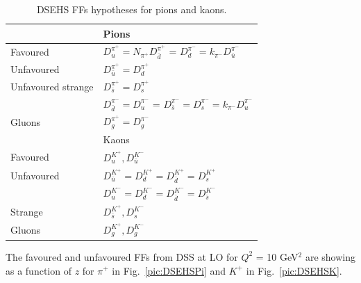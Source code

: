 \begin{table}[!h]
  \caption{DSEHS FFs hypotheses for pions and kaons.}
  \label{tab:DSEHSParametrization}
  \centering
  \begin{tabular}{ll}
    \hline
    \hline
     & Pions \\
    \hline
    Favoured & $D^{\pi^{+}}_{u} = N_{\pi^{+}} D^{\pi^{+}}_{\bar{d}}$ = $D^{\pi^{-}}_{d} = k_{\pi^{-}} D^{\pi^{-}}_{\bar{u}}$ \\
    Unfavoured & $D^{\pi^{+}}_{\bar{u}} = D^{\pi^{+}}_{d}$ \\
    Unfavoured strange & $D^{\pi^{+}}_{\bar{s}} = D^{\pi^{+}}_{s}$ \\
     & $D^{\pi^{-}}_{\bar{d}} = D^{\pi^{-}}_{u}$ = $D^{\pi^{-}}_{\bar{s}} = D^{\pi^{-}}_{s} = k_{\pi^{-}} D^{\pi^{-}}_{u}$ \\
    Gluons & $D^{\pi^{+}}_{g} = D^{\pi^{-}}_{g}$ \\
    \hline
    \hline
     & Kaons \\
    \hline
    Favoured & $D^{K^{+}}_{u}, D^{K^{-}}_{\bar{u}}$ \\
    Unfavoured & $D^{K^{+}}_{\bar{u}} = D^{K^{+}}_{d} = D^{K^{+}}_{\bar{d}} = D^{K^{+}}_{s}$ \\
               & $D^{K^{-}}_{u} = D^{K^{-}}_{d} = D^{K^{-}}_{\bar{d}} = D^{K^{-}}_{\bar{s}}$ \\
    Strange & $D^{K^{+}}_{\bar{s}}, D^{K^{-}}_{s}$ \\
    Gluons & $D^{K^{+}}_{g}, D^{K^{-}}_{g}$ \\
  \end{tabular}
\end{table}

The favoured and unfavoured FFs from DSS at LO for $Q^2$ = 10 GeV$^2$ are showing as a function of $z$ for $\pi^+$ in Fig.~\ref{pic:DSEHSPi} and $K^+$ in Fig.~\ref{pic:DSEHSK}.

